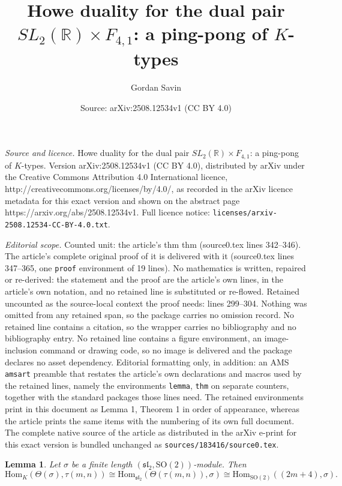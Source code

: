 \documentclass[10pt,a4paper]{amsart}
\title{Howe duality for the dual pair $SL_2(\mathbb R) \times F_{4,1}$: a ping-pong of $K$-types}
\author{Gordan Savin}
\date{Source: arXiv:2508.12534v1 (CC BY 4.0)}
\newtheorem{lemma}{Lemma}
\newcommand{\Hom}{{\mathrm{Hom}}}
\newcommand{\SO}{{\mathrm{SO}}}
\begin{document}
\maketitle

\noindent\emph{Source and licence.} Howe duality for the dual pair $SL_2(\mathbb R) \times F_{4,1}$: a ping-pong of $K$-types. Version arXiv:2508.12534v1 (CC BY 4.0), distributed by arXiv under the Creative Commons Attribution 4.0 International licence, http://creativecommons.org/licenses/by/4.0/, as recorded in the arXiv licence metadata for this exact version and shown on the abstract page https://arxiv.org/abs/2508.12534v1. Full licence notice: \texttt{licenses/arxiv-2508.12534-CC-BY-4.0.txt}.\par\smallskip

\noindent\textit{Editorial scope.} Counted unit: the article's thm thm (source0.tex lines 342--346). The article's complete original proof of it is delivered with it (source0.tex lines 347--365, one \texttt{proof} environment of 19 lines). No mathematics is written, repaired or re-derived: the statement and the proof are the article's own lines, in the article's own notation, and no retained line is substituted or re-flowed.  Retained uncounted as the source-local context the proof needs: lines 299--304.  Nothing was omitted from any retained span, so the package carries no omission record.  No retained line contains a citation, so the wrapper carries no bibliography and no bibliography entry.  No retained line contains a figure environment, an image-inclusion command or drawing code, so no image is delivered and the package declares no asset dependency.  Editorial formatting only, in addition: an AMS \texttt{amsart} preamble that restates the article's own declarations and macros used by the retained lines, namely the environments \texttt{lemma}, \texttt{thm} on separate counters, together with the standard packages those lines need.  The retained environments print in this document as Lemma 1, Theorem 1 in order of appearance, whereas the article prints the same items with the numbering of its own full document.  The complete native source of the article as distributed in the arXiv e-print for this exact version is bundled unchanged as \texttt{sources/183416/source0.tex}.
\begin{lemma} \label{L:1} 
 Let $\sigma$ be a finite length $(\mathfrak{sl}_2,\SO(2))$-module. Then 
\[ 
\Hom_K(\Theta(\sigma), \tau(m,n)) \cong \Hom_{\mathfrak{sl}_2} (\Theta(\tau(m,n)), \sigma) \cong \Hom_{\SO(2)}( (2m+4) , \sigma). 
\] 
\end{lemma} 
\end{document}
